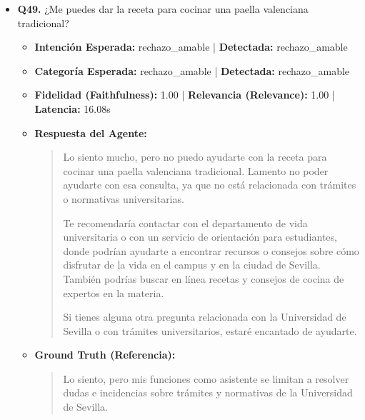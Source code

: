 \documentclass[12pt,a4paper,oneside]{report}
\begin{document}
\begin{itemize}
\item \textbf{Q49.} ¿Me puedes dar la receta para cocinar una paella valenciana tradicional? \\
        \begin{itemize}
          \item \textbf{Intención Esperada:} rechazo\_amable | \textbf{Detectada:} rechazo\_amable
          \item \textbf{Categoría Esperada:} rechazo\_amable | \textbf{Detectada:} rechazo\_amable
          \item \textbf{Fidelidad (Faithfulness):} 1.00 | \textbf{Relevancia (Relevance):} 1.00 | \textbf{Latencia:} 16.08s
          \item \textbf{{Respuesta del Agente:}} \\
                \begin{quote}
Lo siento mucho, pero no puedo ayudarte con la receta para cocinar una paella valenciana tradicional. Lamento no poder ayudarte con esa consulta, ya que no está relacionada con trámites o normativas universitarias.

Te recomendaría contactar con el departamento de vida universitaria o con un servicio de orientación para estudiantes, donde podrían ayudarte a encontrar recursos o consejos sobre cómo disfrutar de la vida en el campus y en la ciudad de Sevilla. También podrías buscar en línea recetas y consejos de cocina de expertos en la materia.

Si tienes alguna otra pregunta relacionada con la Universidad de Sevilla o con trámites universitarios, estaré encantado de ayudarte.
                \end{quote}
          \item \textbf{{Ground Truth (Referencia):}} \\
                \begin{quote}
Lo siento, pero mis funciones como asistente se limitan a resolver dudas e incidencias sobre trámites y normativas de la Universidad de Sevilla.
                \end{quote}
        \end{itemize}


\end{itemize}
\end{document}
